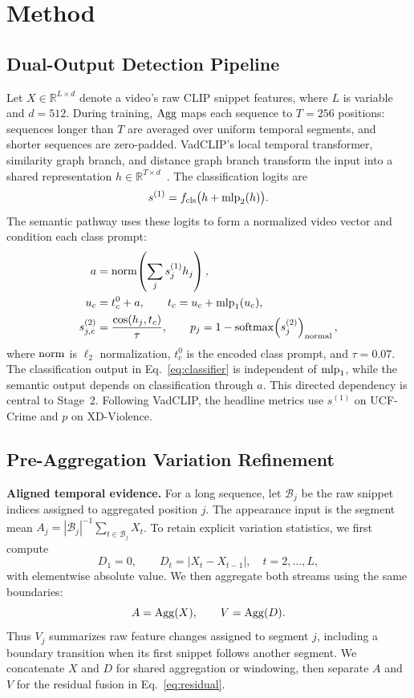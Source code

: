 \section{Method}
\subsection{Dual-Output Detection Pipeline}
Let $X\in\mathbb{R}^{L\times d}$ denote a video's raw CLIP snippet features, where $L$ is variable and $d=512$. During training, $\operatorname{Agg}$ maps each sequence to $T=256$ positions: sequences longer than $T$ are averaged over uniform temporal segments, and shorter sequences are zero-padded. VadCLIP's local temporal transformer, similarity graph branch, and distance graph branch transform the input into a shared representation $h\in\mathbb{R}^{T\times d}$~\cite{wu2024vadclip}. The classification logits are
\begin{equation}
 s^{(1)}=f_{\mathrm{cls}}\big(h+\mathrm{mlp}_2(h)\big).
 \label{eq:classifier}
\end{equation}
The semantic pathway uses these logits to form a normalized video vector and condition each class prompt:
\begin{align}
 a &= \operatorname{norm}\!\left(\sum_j s^{(1)}_j h_j\right), \label{eq:pool}\\
 u_c &= t_c^0+a, \qquad t_c=u_c+\mathrm{mlp}_1(u_c), \label{eq:prompt}\\
 s^{(2)}_{j,c}&=\frac{\cos(h_j,t_c)}{\tau},\qquad
 p_j=1-\operatorname{softmax}\!\left(s^{(2)}_j\right)_{\mathrm{normal}},
 \label{eq:semantic}
\end{align}
where $\operatorname{norm}$ is $\ell_2$ normalization, $t_c^0$ is the encoded class prompt, and $\tau=0.07$. The classification output in Eq.~\eqref{eq:classifier} is independent of $\mathrm{mlp}_1$, while the semantic output depends on classification through $a$. This directed dependency is central to Stage~2. Following VadCLIP, the headline metrics use $s^{(1)}$ on UCF-Crime and $p$ on XD-Violence.

\subsection{Pre-Aggregation Variation Refinement}
\textbf{Aligned temporal evidence.}
For a long sequence, let $\mathcal{B}_j$ be the raw snippet indices assigned to aggregated position $j$. The appearance input is the segment mean $A_j=|\mathcal{B}_j|^{-1}\sum_{t\in\mathcal{B}_j}X_t$. To retain explicit variation statistics, we first compute
\begin{equation}
 D_1=0,\qquad D_t=|X_t-X_{t-1}|,\quad t=2,\ldots,L,
 \label{eq:variation}
\end{equation}
with elementwise absolute value. We then aggregate both streams using the same boundaries:
\begin{equation}
 A=\operatorname{Agg}(X),\qquad V=\operatorname{Agg}(D).
 \label{eq:aligned}
\end{equation}
Thus $V_j$ summarizes raw feature changes assigned to segment $j$, including a boundary transition when its first snippet follows another segment. We concatenate $X$ and $D$ for shared aggregation or windowing, then separate $A$ and $V$ for the residual fusion in Eq.~\eqref{eq:residual}.

